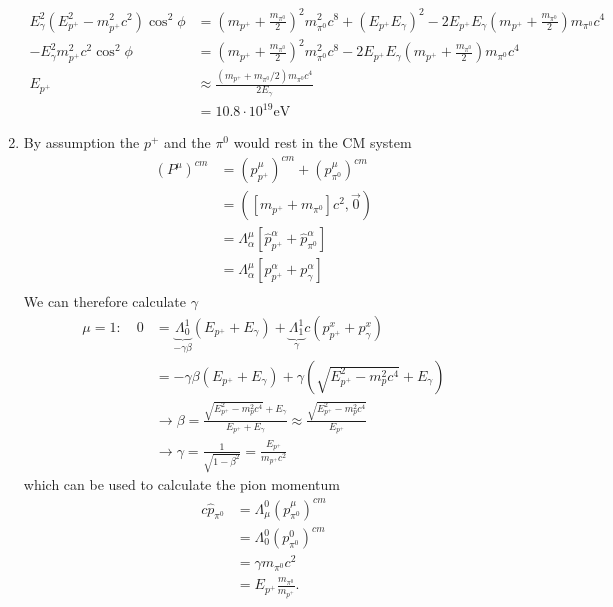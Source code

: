 \documentclass[10pt,a4paper]{article}
\theoremstyle{definition}
\begin{document}
\begin{enumerate}
\begin{align}
        E_\gamma^2\left(E_{p^+}^2-m_{p^+}^2c^2\right)\cos^2{\phi}
        &=\left(m_{p^+}+\frac{m_{\pi^0}}{2}\right)^2m_{\pi^0}^2c^8+(E_{p^+}E_\gamma)^2-2E_{p^+}E_\gamma\left(m_{p^+}+\frac{m_{\pi^0}}{2}\right)m_{\pi^0}c^4\\
        -E_\gamma^2m_{p^+}^2c^2\cos^2{\phi}
        &=\left(m_{p^+}+\frac{m_{\pi^0}}{2}\right)^2m_{\pi^0}^2c^8-2E_{p^+}E_\gamma\left(m_{p^+}+\frac{m_{\pi^0}}{2}\right)m_{\pi^0}c^4\\
        E_{p^+}&\approx\frac{\left(m_{p^+}+m_{\pi^0}/2\right)m_{\pi^0}c^4}{2E_\gamma}\\
        &=10.8\cdot 10^{19}\text{eV}
    \end{align}
    \item By assumption the $p^+$ and the $\pi^0$ would rest in the CM system
    \begin{align}
        (P^\mu)^{cm}&=(p^\mu_{p^+})^{cm}+(p^\mu_{\pi^0})^{cm}\\
                    &=\left([m_{p^+}+m_{\pi^0}]c^2,\vec{0}\right)\\
                    &=\Lambda^\mu_\alpha\left[\hat p^\alpha_{p^+}+\hat p^\alpha_{\pi^0}\right]\\
                    &=\Lambda^\mu_\alpha\left[ p^\alpha_{p^+}+ p^\alpha_{\gamma}\right]\\
    \end{align}
    We can therefore calculate $\gamma$
    \begin{align}
        \mu=1:\quad0&=\underbrace{\Lambda^1_0}_{-\gamma\beta}(E_{p^+}+E_\gamma)+\underbrace{\Lambda^1_1}_{\gamma}c(p^x_{p^+}+p^x_\gamma)\\
        &=-\gamma\beta(E_{p^+}+E_\gamma)+\gamma\left(\sqrt{E_{p^+}^2-m_p^2c^4}+E_\gamma\right)\\
        &\rightarrow\beta=\frac{\sqrt{E_{p^+}^2-m_p^2c^4}+E_\gamma}{E_{p^+}+E_\gamma}\approx\frac{\sqrt{E_{p^+}^2-m_p^2c^4}}{E_{p^+}}\\
        &\rightarrow\gamma=\frac{1}{\sqrt{1-\beta^2}}=\frac{E_{p^+}}{m_{p^+}c^2}
    \end{align}
    which can be used to calculate the pion momentum
    \begin{align}
        c\hat{p}_{\pi^0}&=\Lambda^0_\mu (p_{\pi^0}^\mu)^{cm}\\
        &=\Lambda^0_0 (p_{\pi^0}^0)^{cm}\\
        &=\gamma m_{\pi^0}c^2\\
        &=E_{p^+}\frac{m_{\pi^0}}{m_{p^+}}.
    \end{align}

\end{enumerate}
\end{document}
